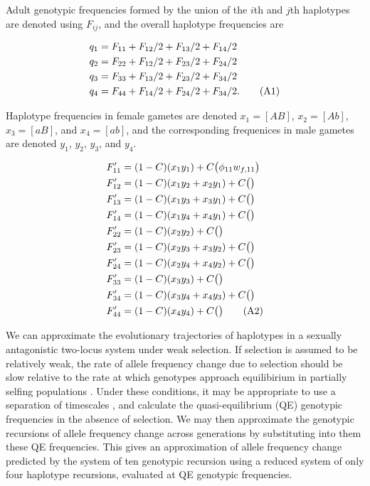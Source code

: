 \documentclass{article}
\newcommand\numberthis{\addtocounter{equation}{1}\tag{\theequation}}
\begin{document}
 Adult genotypic frequencies formed by the union of the $i$th and $j$th haplotypes are denoted using $F_{ij}$, and the overall haplotype frequencies are

\begin{align*}
	q_1 &= F_{11} + F_{12}/2 + F_{13}/2 + F_{14}/2 \\
	q_2 &= F_{22} + F_{12}/2 + F_{23}/2 + F_{24}/2 \\
	q_3 &= F_{33} + F_{13}/2 + F_{23}/2 + F_{34}/2 \\
	q_4 &= F_{44} + F_{14}/2 + F_{24}/2 + F_{34}/2. \numberthis \label{eqn}
\end{align*} 

Haplotype frequencies in female gametes are denoted $x_1 = [AB]$, $x_2 = [Ab]$, $x_3 = [aB]$, and $x_4 = [ab]$, and the corresponding frequenices in male gametes are denoted $y_1$, $y_2$, $y_3$, and $y_4$. 

\begin{align*}
	F'_{11} &= (1 - C) (x_1 y_1) + C \big(\phi_{11} w_{f,11}  \big)  \\
	F'_{12} &= (1 - C) (x_1 y_2 + x_2 y_1) + C \big(  \big)  \\
	F'_{13} &= (1 - C) (x_1 y_3 + x_3 y_1) + C \big(  \big)  \\
	F'_{14} &= (1 - C) (x_1 y_4 + x_4 y_1) + C \big(  \big)  \\
	F'_{22} &= (1 - C) (x_2 y_2) + C \big(  \big)  \\
	F'_{23} &= (1 - C) (x_2 y_3 + x_3 y_2) + C \big(  \big)  \\
	F'_{24} &= (1 - C) (x_2 y_4 + x_4 y_2) + C \big(  \big)  \\
	F'_{33} &= (1 - C) (x_3 y_3) + C \big(  \big)  \\
	F'_{34} &= (1 - C) (x_3 y_4 + x_4 y_3)+ C \big(  \big)  \\
	F'_{44} &= (1 - C) (x_4 y_4) + C \big(  \big)  \numberthis
\end{align*}



We can approximate the evolutionary trajectories of haplotypes in a sexually antagonistic two-locus system under weak selection. If selection is assumed to be relatively weak, the rate of allele frequency change due to selection should be slow relative to the rate at which genotypes approach equilibirium in partially selfing populations \citep{Nagylaki1997}. Under these conditions, it may be appropriate to use a separation of timescales \citep{OttoDay2007}, and calculate the quasi-equilibrium (QE) genotypic frequencies in the absence of selection. We may then approximate the genotypic recursions of allele frequency change across generations by substituting into them these QE frequencies. This gives an approximation of allele frequency change predicted by the system of ten genotypic recursion using a reduced system of only four haplotype recursions, evaluated at QE genotypic frequencies. 
\end{document}
